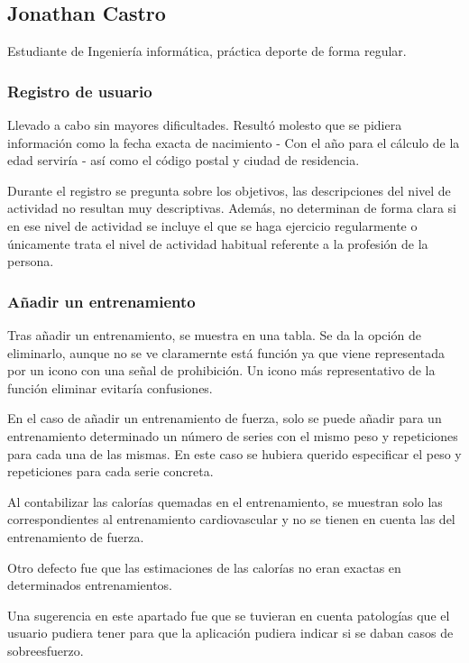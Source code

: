 \documentclass[a4paper]{article}
\begin{document}
	\subsection{Jonathan Castro}
	
	Estudiante de Ingeniería informática, práctica deporte de forma regular.
	
		\subsubsection*{Registro de usuario}
		
		Llevado a cabo sin mayores dificultades. Resultó molesto que se pidiera información como la fecha exacta de nacimiento - Con el año para el cálculo de la edad serviría - así como el código postal y ciudad de residencia.
		
		Durante el registro se pregunta sobre los objetivos, las descripciones del nivel de actividad no resultan muy descriptivas. Además, no determinan de forma clara si en ese nivel de actividad se incluye el que se haga ejercicio regularmente o únicamente trata el nivel de actividad habitual referente a la profesión de la persona.
		
		\subsubsection*{Añadir un entrenamiento}
		
		Tras añadir un entrenamiento, se muestra en una tabla. Se da la opción de eliminarlo, aunque no se ve claramernte está función ya que viene representada por un icono con una señal de prohibición. Un icono más representativo de la función eliminar evitaría confusiones.
		
		En el caso de añadir un entrenamiento de fuerza, solo se puede añadir para un entrenamiento determinado un número de series con el mismo peso y repeticiones para cada una de las mismas. En este caso se hubiera querido especificar el peso y repeticiones para cada serie concreta.
		
		Al contabilizar las calorías quemadas en el entrenamiento, se muestran solo las correspondientes al entrenamiento cardiovascular y no se tienen en cuenta las del entrenamiento de fuerza.
		
		Otro defecto fue que las estimaciones de las calorías no eran exactas en determinados entrenamientos.
		
		Una sugerencia en este apartado fue que se tuvieran en cuenta patologías que el usuario pudiera tener para que la aplicación pudiera indicar si se daban casos de sobreesfuerzo.
		
\end{document}
